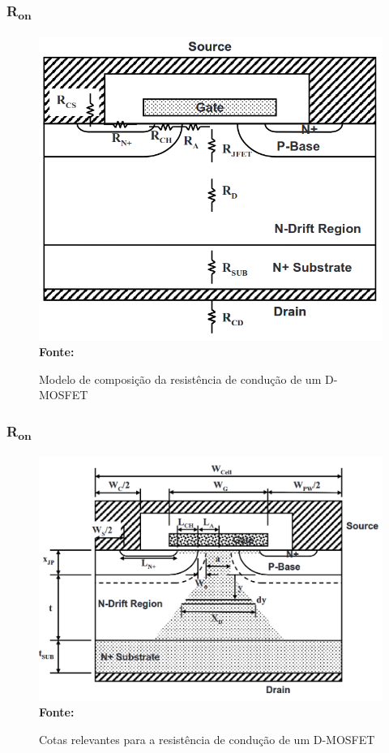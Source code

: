 \begin{frame}
    
    \frametitle{R\textsubscript{on}}

    \begin{figure}[!htbp]
        \centering
        \caption{Modelo de composição da resistência de condução de um D-MOSFET}
        \includegraphics[scale=0.2]{imagens/rondmos_association.png}
        \\\small{\textbf{Fonte:} \cite{baliga2010fundamentals}}%
    \end{figure}

\end{frame}

\begin{frame}
    
    \frametitle{R\textsubscript{on}}

    \begin{figure}[!htbp]
        \centering
        \caption{Cotas relevantes para a resistência de condução de um D-MOSFET}
        \includegraphics[scale=0.2]{imagens/rondmos_geometry.png}
        \\\small{\textbf{Fonte:} \cite{baliga2010fundamentals}}%
    \end{figure}

\end{frame}

